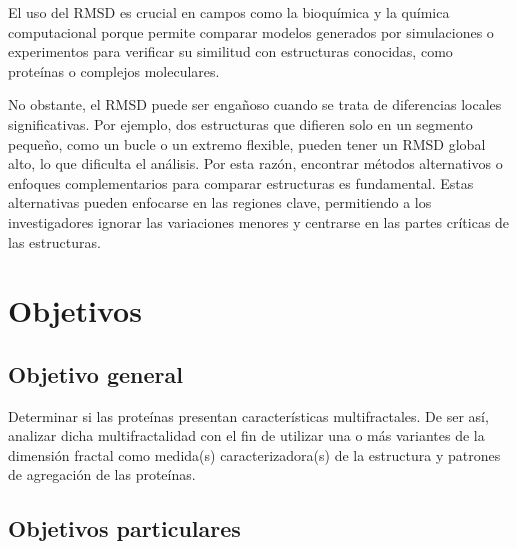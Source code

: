 \documentclass[11pt]{article}
\begin{document}
El uso del RMSD es crucial en campos como la bioqu\'{i}mica 
y la qu\'{i}mica computacional porque permite comparar modelos generados por 
simulaciones o experimentos para verificar su similitud con estructuras 
conocidas, como prote\'{i}nas o complejos moleculares.

No obstante, el RMSD puede ser engañoso cuando se trata de diferencias
 locales significativas. Por ejemplo, dos estructuras que difieren solo 
 en un segmento pequeño, como un bucle o un extremo flexible, pueden tener 
 un RMSD global alto, lo que dificulta el an\'{a}lisis. Por esta raz\'{o}n, encontrar
  m\'{e}todos alternativos o enfoques complementarios para comparar estructuras 
  es fundamental. Estas alternativas pueden enfocarse en las regiones clave,
   permitiendo a los investigadores ignorar las variaciones menores y 
  centrarse en las partes cr\'{i}ticas de las estructuras.

\clearpage


\section{Objetivos}
\subsection{Objetivo general}

Determinar si las prote\'{i}nas presentan caracter\'{i}sticas multifractales. De ser as\'{i}, analizar
dicha multifractalidad con el fin de utilizar una o m\'{a}s variantes de la
dimensi\'{o}n fractal como medida(s) caracterizadora(s)
de la estructura y patrones de agregaci\'{o}n de las prote\'{i}nas.


\subsection{Objetivos particulares}
\end{document}
